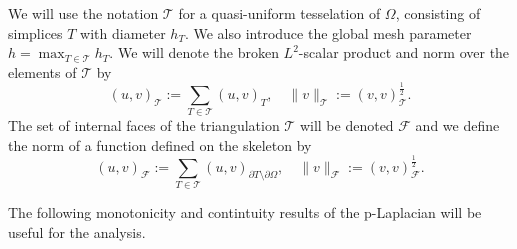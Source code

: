 \documentclass[10pt]{amsart}
\numberwithin{equation}{section}
\theoremstyle{definition}
\theoremstyle{remark}
\renewcommand{\(}{\bigl(}
\renewcommand{\)}{\bigr)}
\begin{document}
We will use the notation $\mathcal{T}$ for a quasi-uniform
tesselation of $\Omega$, consisting of simplices $T$ with diameter
$h_T$.  We also introduce the global mesh parameter $h = \max_{T \in
  \mathcal{T}} h_T$. We will denote the broken $L^2$-scalar product
and norm over the elements
of $\mathcal{T}$ by
\[
(u,v) _{\mathcal{T}} := \sum_{T\in \mathcal{T}} (u,v)_{T}, \quad 
\|v\|_{\mathcal{T}} := (v,v) _{\mathcal{T}}^{\frac12}.
\]
 The set of internal faces of the triangulation
$\mathcal{T}$ will be denoted $\mathcal{F}$ and we define the norm of
a function defined on
the skeleton by
\[
(u,v) _{\mathcal{F}} := \sum_{T\in \mathcal{T}} (u,v)_{\partial
    T \setminus \partial \Omega},\quad \|v\|_{\mathcal{F}} := (v,v) _{\mathcal{F}}^{\frac12}.
\]

The following monotonicity and contintuity results of the p-Laplacian
will be useful for the analysis.
\end{document}
